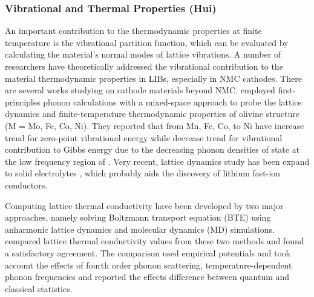 \documentclass[../main.tex]{subfiles}
\begin{document}
\subsubsection{ Vibrational and Thermal Properties (Hui)}
An important contribution to the thermodynamic properties at finite temperature is the vibrational partition function, which can be evaluated by calculating the material’s normal modes of lattice vibrations. A number of researchers have theoretically addressed the vibrational contribution to the material thermodynamic properties in LIBs, especially in NMC cathodes. \cite{du2016insight,yang2019highly,yang2020chemical} There are several works studying on cathode materials beyond NMC. \citeauthor{shang2012lattice} employed first-principles phonon calculations with a mixed-space approach to probe the lattice dynamics and finite-temperature thermodynamic properties of olivine structure  (M = Mo, Fe, Co, Ni).\cite{shang2012lattice} They reported that  from Mn, Fe, Co, to Ni have increase trend for zero-point vibrational energy while decrease trend for vibrational contribution to Gibbs energy due to the decreasing phonon densities of state at the low frequency region of .
Very recent, lattice dynamics study has been expand to solid electrolytes , which probably aids the discovery of lithium fast-ion conductors. \cite{sagotra2019influence} 

Computing lattice thermal conductivity have been developed by two major approaches, namely  solving Boltzmann transport equation (BTE) using anharmonic lattice dynamics and molecular dynamics (MD) simulations. \citeauthor{puligheddu2019computational} compared lattice thermal conductivity values from these two methods and found a satisfactory agreement.\cite{puligheddu2019computational} The comparison used empirical potentials and took account the effects of fourth order phonon scattering, temperature-dependent phonon frequencies and reported the effects difference between quantum and classical statistics.
\end{document}

